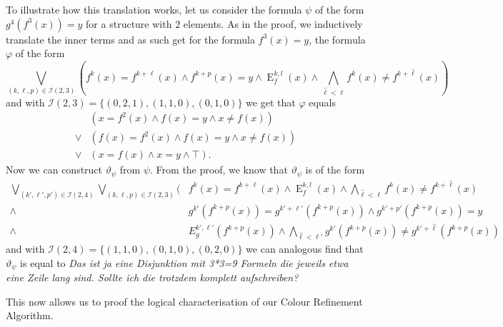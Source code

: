 \documentclass[a4paper,11pt,DIV=15]{scrartcl} %
\renewcommand{\phi}{\varphi}
\theoremstyle{plain}
\theoremstyle{definition}
\renewcommand{\theta}{\vartheta}
\begin{document}
To illustrate how this translation works, let us consider the formula $\psi$ of the form $g^4(f^3(x))=y$ for a structure with $2$ elements.
As in the proof, we inductively translate the inner terms and as such get for the formula $f^3(x)=y$, the formula $\phi$ of the form
$$\bigvee_{(k,\ell,p)\in \mathcal I(2,3)}\left(f^k(x)=f^{k+\ell}(x)\land f^{k+p}(x)=y \land \operatorname{E}^{k,l}_f(x)\land\bigwedge_{\hat \ell < \ell} f^k(x)\neq f^{k+\hat\ell}(x)\right)$$
and with $\mathcal I(2,3)=\{(0,2,1),(1,1,0),(0,1,0)\}$ we get that $\phi$ equals
\begin{align*}
	\phantom{\lor}&\left(x=f^2(x) \land f(x)=y \land x\neq f(x)\right) \\
	\lor & \left(f(x)=f^2(x) \land f(x)=y \land x \neq f(x)\right) \\
	\lor & \left(x=f(x) \land x=y \land \top\right).
\end{align*}
Now we can construct $\theta_\psi$ from $\psi$. 
From the proof, we know that $\theta_\psi$ is of the form
\begin{align*}
	\bigvee_{(k',\ell',p')\in \mathcal I(2,4)}\bigvee_{(k,\ell,p)\in \mathcal I(2,3)} ( &f^k(x)=f^{k+\ell}(x)\land \operatorname{E}^{k,l}_f(x)\land\bigwedge_{\hat{\ell}<\ell}f^k(x)\neq f^{k+\hat\ell}(x) \\
	\land & g^{k'}(f^{k+p}(x))=g^{k'+\ell'}(f^{k+p}(x)) \land g^{k'+p'}(f^{k+p}(x)) = y \\
	\land & E^{k',\ell'}_g(f^{k+p}(x)) \land \bigwedge_{\hat{\ell}<\ell'}g^{k'}(f^{k+p}(x))\neq g^{k'+\hat\ell}(f^{k+p}(x))
\end{align*}
and with $\mathcal I(2,4)=\{(1,1,0),(0,1,0), (0,2,0)\}$ we can analogous find that $\theta_\psi$ is equal to
\emph{Das ist ja eine Disjunktion mit 3*3=9 Formeln die jeweils etwa eine Zeile lang sind. Sollte ich die trotzdem komplett aufschreiben?}

This now allows us to proof the logical characterisation of our Colour Refinement Algorithm.
\end{document}
